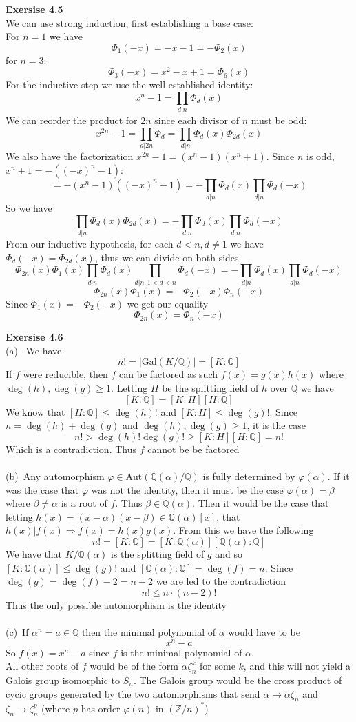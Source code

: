 \documentclass[12pt]{article}
\newenvironment{ques}[1]{\textbf{Exersise #1}\vspace{1 mm}\\ }{\bigskip}
\theoremstyle{definition}
\newcommand{\Q}{\mathbb Q}
\newcommand{\Z}{\mathbb Z}
\renewcommand{\a}{\alpha}
\renewcommand{\b}{\beta}
\newcommand{\Aut}{\text{Aut}}
\newcommand{\Gal}{\text{Gal}}
\begin{document}
\begin{ques}{4.5}
	We can use strong induction, first establishing a base case:\\
	For $n = 1$ we have
	$$\Phi_1(-x) = -x - 1 = -\Phi_2(x)$$
	for $n = 3$:
	$$\Phi_3(-x) = x^2 - x + 1 = \Phi_6(x)$$
	For the inductive step we use the well established identity:
	$$x^n - 1 = \prod_{d | n} \Phi_d(x)$$
	We can reorder the product for $2n$ since each divisor of $n$ must be odd:
	$$x^{2n} - 1 = \prod_{d|2n}\Phi_d = \prod_{d|n}\Phi_d(x) \Phi_{2d}(x) $$
	We also have the factorization $x^{2n} - 1 = (x^n - 1)(x^n + 1)$. Since $n$
	is odd, $x^n + 1 = -((-x)^n - 1)$:
	$$= -(x^n - 1)((-x)^n - 1) = -\prod_{d | n} \Phi_d(x)\prod_{d | n}
	\Phi_d(-x) $$
	So we have
	$$\prod_{d|n}\Phi_d(x) \Phi_{2d}(x) =-\prod_{d | n} \Phi_d(x)\prod_{d | n}
	\Phi_d(-x) $$
	From our inductive hypothesis, for each $d < n, d \neq 1$ we have
	$\Phi_d(-x) = \Phi_{2d}(x)$, thus we can divide on both sides
	$$\Phi_{2n}(x)\Phi_1(x)\prod_{d|n} \Phi_d(x) \prod_{d|n, 1 < d <
	n}\Phi_{d}(-x) =-\prod_{d | n} \Phi_d(x)\prod_{d | n} \Phi_d(-x) $$
	$$\Phi_{2n}(x)\Phi_1(x) = -\Phi_2(-x)\Phi_n(-x)$$
	Since $\Phi_1(x) = -\Phi_2(-x)$ we get our equality
	$$\Phi_{2n}(x) = \Phi_n(-x)$$
\end{ques}

\begin{ques}{4.6}
	(a) \ We have
	$$n! = |\Gal(K/\Q)| = [K:\Q]$$
	If $f$ were reducible, then $f$ can be factored as such $f(x) = g(x)h(x)$
	where $\deg(h),\deg(g) \geq 1$.
	Letting $H$ be the splitting field of $h$ over $\Q$ we have 
	$$[K:\Q] = [K:H][H:\Q]$$
	We know that $[H:\Q] \leq \deg(h)!$ and $[K:H] \leq \deg(g)!$. Since
	$n = \deg(h) + \deg(g)$ and $\deg(h),\deg(g) \geq 1$, it is the case
	$$n! > \deg(h)! \deg(g)! \geq [K:H][H:\Q] = n!$$
	Which is a contradiction. Thus $f$ cannot be be factored\\
	\\
	(b)\ Any automorphism $\varphi \in \Aut(\Q(\a)/\Q)$ is fully determined by
	$\varphi(\a)$. If it was the case that $\varphi$ was not the identity, then
	it must be the case $\varphi(\a) = \beta$ where $\beta \neq \a$ is a root of $f$.
	Thus $\beta \in \Q(\a)$. Then it would be the case that letting $h(x) =
	(x-\a)(x-\b) \in \Q(\a)[x]$, that $h(x)|f(x) \Rightarrow f(x) = h(x)g(x)$.
	From this we have the following
	$$n! = [K:\Q] = [K:\Q(\a)][\Q(\a):\Q]$$
	We have that $K/\Q(\a)$ is the splitting field of $g$ and so $[K:\Q(\a)]
	\leq \deg(g)!$ and $[\Q(\a):\Q] = \deg(f) = n$. Since $\deg(g) = \deg(f) -
	2 = n-2$ we are led to the contradiction
	$$n! \leq n \cdot (n-2)!$$
	Thus the only possible automorphism is the identity\\
	\\
	(c)\ If $\a^n = a\in \Q$ then the minimal polynomial of $\a$ would have to be 
	$$x^n - a$$
	So $f(x) = x^n - a$ since $f$ is the minimal polynomial of $\a$.\\
	All other roots of $f$ would be of the form $\a\zeta_n^k$ for some $k$, and
	this will not yield a Galois group isomorphic to $S_n$. The Galois group
	would be the cross product of cycic groups generated by the two automorphisms
	that send $\a \to \a\zeta_n$ and $\zeta_n \to \zeta_n^p$ (where $p$ has
	order $\varphi(n)$ in $(\Z/n)^*$)
\end{ques}
\end{document}
